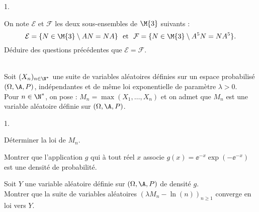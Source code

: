 \documentclass[11pt]{article}%
\begin{document}
\begin{exerciceAP}
\begin{noliste}{1.}
  \item On note $\mathcal{E}$ et $\mathcal{F}$ les deux sous-ensembles
    de $\M{3}$ suivants :
    \[
    \mathcal{E}=\{N\in\M{3} \setminus AN=NA\} \ \mbox{ et } \
    \mathcal{F}=\{N\in\M{3} \setminus A^5N=NA^5\}.
    \]
    Déduire des questions précédentes que $\mathcal{E}=\mathcal{F}$.
  \end{noliste}
\end{exerciceAP}


\begin{exerciceSP}~\\
  Soit $(X_n)_{n\in\N^*}$ une suite de variables aléatoires définies
  sur un espace probabilisé $(\Omega,\A,P)$, indépendantes et de même
  loi exponentielle de paramètre $\lambda>0$.\\
  Pour $n\in\N^*$, on pose : $M_n=\max(X_1,\hdots,X_n)$ et on admet
  que $M_n$ est une variable aléatoire définie sur $(\Omega,\A,P)$.
  \begin{noliste}{1.}
    \setlength{\itemsep}{2mm}
  \item Déterminer la loi de $M_n$.
  \item Montrer que l'application $g$ qui à tout réel $x$ associe
    $g(x)=\ee^{-x}\exp\left(-\ee^{-x}\right)$ est une densité de
    probabilité.
  \item Soit $Y$ une variable aléatoire définie sur $(\Omega,\A,P)$ de
    densité $g$.\\
    Montrer que la suite de variables aléatoires $(\lambda M_n -
    \ln(n))_{n\geq 1}$ converge en loi vers $Y$.
  \end{noliste}
\end{exerciceSP}



\newpage
\end{document}
